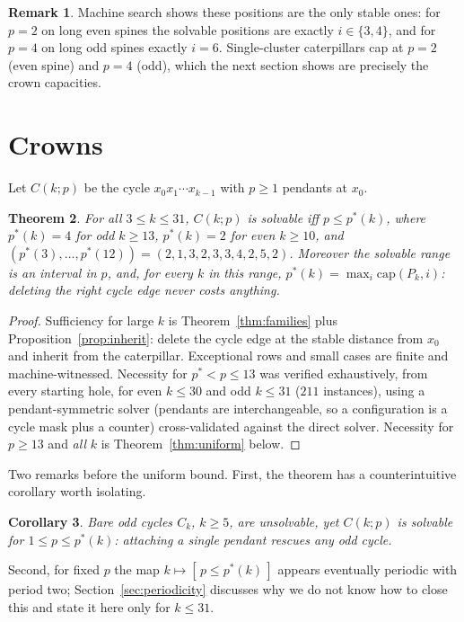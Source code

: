 \documentclass[11pt]{article}
\newtheorem{theorem}{Theorem}[section]
\newtheorem{corollary}[theorem]{Corollary}
\theoremstyle{definition}
\newtheorem{remark}[theorem]{Remark}
\newcommand{\cp}{\mathrm{cap}}
\begin{document}
\begin{remark}
Machine search shows these positions are the only stable ones: for
$p=2$ on long even spines the solvable positions are exactly
$i\in\{3,4\}$, and for $p=4$ on long odd spines exactly $i=6$.
Single-cluster caterpillars cap at $p=2$ (even spine) and $p=4$
(odd), which the next section shows are precisely the crown
capacities.
\end{remark}

\section{Crowns}\label{sec:crowns}

Let $C(k;p)$ be the cycle $x_0x_1\cdots x_{k-1}$ with $p\ge 1$
pendants at $x_0$.

\begin{theorem}\label{thm:crown}
For all $3\le k\le 31$, $C(k;p)$ is solvable iff $p\le p^*(k)$,
where $p^*(k)=4$ for odd $k\ge 13$, $p^*(k)=2$ for even $k\ge 10$,
and $(p^*(3),\dots,p^*(12))=(2,1,3,2,3,3,4,2,5,2)$. Moreover the
solvable range is an interval in $p$, and, for every $k$ in this
range, $p^*(k)=\max_i \cp(P_k,i)$: deleting the right cycle edge
never costs anything.
\end{theorem}

\begin{proof}
Sufficiency for large $k$ is Theorem~\ref{thm:families} plus
Proposition~\ref{prop:inherit}: delete the cycle edge at the stable
distance from $x_0$ and inherit from the caterpillar. Exceptional
rows and small cases are finite and machine-witnessed. Necessity for
$p^*<p\le 13$ was verified exhaustively, from every starting hole,
for even $k\le 30$ and odd $k\le 31$ ($211$ instances), using a
pendant-symmetric solver (pendants are interchangeable, so a
configuration is a cycle mask plus a counter) cross-validated against
the direct solver. Necessity for $p\ge 13$ and \emph{all} $k$ is
Theorem~\ref{thm:uniform} below.
\end{proof}

Two remarks before the uniform bound. First, the theorem has a
counterintuitive corollary worth isolating.

\begin{corollary}\label{cor:rescue-odd}
Bare odd cycles $C_k$, $k\ge 5$, are unsolvable, yet $C(k;p)$ is
solvable for $1\le p\le p^*(k)$: attaching a single pendant rescues
any odd cycle.
\end{corollary}

Second, for fixed $p$ the map $k\mapsto[\,p\le p^*(k)\,]$ appears
eventually periodic with period two; Section~\ref{sec:periodicity}
discusses why we do not know how to close this and state it here
only for $k\le 31$.
\end{document}
